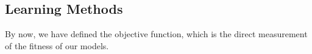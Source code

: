 \subsection {Learning Methods}
By now, we have defined the objective function, which is the direct measurement of the fitness of our models. 